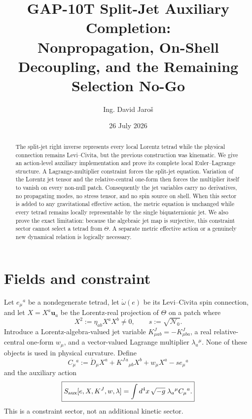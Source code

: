 \documentclass[11pt,a4paper]{article}
\title{GAP-10T Split-Jet Auxiliary Completion:\\
Nonpropagation, On-Shell Decoupling, and the Remaining Selection No-Go}
\author{Ing. David Jaro\v{s}}
\date{26 July 2026}
\begin{document}
\maketitle

\begin{abstract}
The split-jet right inverse represents every local Lorentz tetrad while the
physical connection remains Levi--Civita, but the previous construction was
kinematic.  We give an action-level auxiliary implementation and prove its
complete local Euler--Lagrange structure.  A Lagrange-multiplier constraint
forces the split-jet equation.  Variation of the Lorentz jet tensor and the
relative-central one-form then forces the multiplier itself to vanish on every
non-null patch.  Consequently the jet variables carry no derivatives, no
propagating modes, no stress tensor, and no spin source on shell.  When this
sector is added to any gravitational effective action, the metric equation is
unchanged while every tetrad remains locally representable by the single
biquaternionic jet.  We also prove the exact limitation: because the algebraic
jet map is surjective, this constraint sector cannot select a tetrad from
$\Theta$.  A separate metric effective action or a genuinely new dynamical
relation is logically necessary.
\end{abstract}

\section{Fields and constraint}
Let $e_\mu{}^a$ be a nondegenerate tetrad, let
$\mathring\omega(e)$ be its Levi--Civita spin connection, and let
$X=X^a\mathbf u_a$ be the Lorentz-real projection of $\Theta$ on a patch
where
\begin{equation}
 X^2:=\eta_{ab}X^aX^b\ne0,
 \qquad s:=\sqrt{\mathcal N_0}.
\end{equation}
Introduce a Lorentz-algebra-valued jet variable
$K^J_{\mu ab}=-K^J_{\mu ba}$, a real relative-central one-form $w_\mu$, and
a vector-valued Lagrange multiplier $\lambda_a{}^\mu$.  None of these objects
is used in physical curvature.  Define
\begin{equation}
 C_\mu{}^a:=\mathring D_\mu X^a
 +K^{J\,a}{}_{\mu b}X^b+w_\mu X^a-s e_\mu{}^a
\end{equation}
and the auxiliary action
\begin{equation}
 \boxed{
 S_{\rm aux}[e,X,K^J,w,\lambda]
 =\int d^4x\,\sqrt{-g}\;\lambda_a{}^\mu C_\mu{}^a.}
 \label{eq:Saux}
\end{equation}
This is a constraint sector, not an additional kinetic sector.
\end{document}
